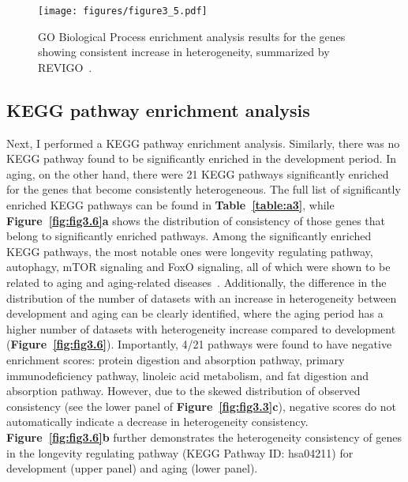 \begin{landscape}
\begin{figure}[!ht]
    \centering
    \texttt{[image: figures/figure3\_5.pdf]}
    \caption{GO Biological Process enrichment analysis results for the genes showing consistent increase in heterogeneity, summarized by REVIGO~\autocite{Supek2011}.}
    \label{fig:fig3.5}
\end{figure}
\end{landscape}

\subsection{KEGG pathway enrichment analysis}
Next, I performed a KEGG pathway enrichment analysis. 
Similarly, there was no KEGG pathway found to be significantly enriched in the development period.
In aging, on the other hand, there were 21 KEGG pathways significantly enriched for the genes that become consistently heterogeneous. 
The full list of significantly enriched KEGG pathways can be found in \textbf{Table~\ref{table:a3}},
while \textbf{Figure~\ref{fig:fig3.6}a} shows the distribution of consistency of those genes that belong to significantly enriched pathways. 
Among the significantly enriched KEGG pathways, the most notable ones were longevity regulating pathway, autophagy, mTOR signaling and FoxO signaling, 
all of which were shown to be related to aging and aging-related diseases~\autocite{Rubinsztein2011, Johnson2013, Martins2016}.
Additionally, the difference in the distribution of the number of datasets with an increase in heterogeneity between development and aging can be clearly identified,
where the aging period has a higher number of datasets with heterogeneity increase compared to development (\textbf{Figure~\ref{fig:fig3.6}}).
Importantly, 4/21 pathways were found to have negative enrichment scores: protein digestion and absorption pathway, primary immunodeficiency pathway, linoleic acid metabolism, and fat digestion and absorption pathway.
However, due to the skewed distribution of observed consistency (see the lower panel of \textbf{Figure~\ref{fig:fig3.3}c}), 
negative scores do not automatically indicate a decrease in heterogeneity consistency. \textbf{Figure~\ref{fig:fig3.6}b} further demonstrates the heterogeneity consistency of genes in the longevity regulating pathway 
(KEGG Pathway ID: hsa04211) for development (upper panel) and aging (lower panel).

